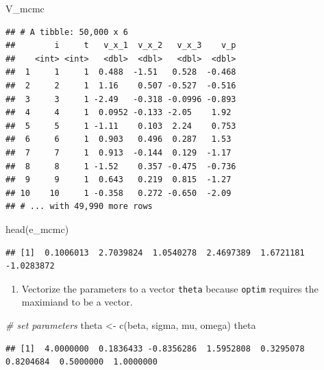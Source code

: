\documentclass[
]{book}
\newenvironment{Shaded}{\begin{snugshade}}{\end{snugshade}}
\newcommand{\CommentTok}[1]{\textcolor[rgb]{0.56,0.35,0.01}{\textit{#1}}}
\newcommand{\FunctionTok}[1]{\textcolor[rgb]{0.00,0.00,0.00}{#1}}
\newcommand{\NormalTok}[1]{#1}
\newcommand{\OtherTok}[1]{\textcolor[rgb]{0.56,0.35,0.01}{#1}}
\providecommand{\tightlist}{%
  \setlength{\itemsep}{0pt}\setlength{\parskip}{0pt}}
\begin{document}
\begin{Shaded}
\begin{Highlighting}[]
\NormalTok{V\_mcmc}
\end{Highlighting}
\end{Shaded}

\begin{verbatim}
## # A tibble: 50,000 x 6
##        i     t   v_x_1  v_x_2   v_x_3    v_p
##    <int> <int>   <dbl>  <dbl>   <dbl>  <dbl>
##  1     1     1  0.488  -1.51   0.528  -0.468
##  2     2     1  1.16    0.507 -0.527  -0.516
##  3     3     1 -2.49   -0.318 -0.0996 -0.893
##  4     4     1  0.0952 -0.133 -2.05    1.92 
##  5     5     1 -1.11    0.103  2.24    0.753
##  6     6     1  0.903   0.496  0.287   1.53 
##  7     7     1  0.913  -0.144  0.129  -1.17 
##  8     8     1 -1.52    0.357 -0.475  -0.736
##  9     9     1  0.643   0.219  0.815  -1.27 
## 10    10     1 -0.358   0.272 -0.650  -2.09 
## # ... with 49,990 more rows
\end{verbatim}

\begin{Shaded}
\begin{Highlighting}[]
\FunctionTok{head}\NormalTok{(e\_mcmc)}
\end{Highlighting}
\end{Shaded}

\begin{verbatim}
## [1]  0.1006013  2.7039824  1.0540278  2.4697389  1.6721181 -1.0283872
\end{verbatim}

\begin{enumerate}
\def\labelenumi{\arabic{enumi}.}
\setcounter{enumi}{1}
\tightlist
\item
  Vectorize the parameters to a vector \texttt{theta} because \texttt{optim} requires the maximiand to be a vector.
\end{enumerate}

\begin{Shaded}
\begin{Highlighting}[]
\CommentTok{\# set parameters}
\NormalTok{theta }\OtherTok{\textless{}{-}} \FunctionTok{c}\NormalTok{(beta, sigma, mu, omega)}
\NormalTok{theta}
\end{Highlighting}
\end{Shaded}

\begin{verbatim}
## [1]  4.0000000  0.1836433 -0.8356286  1.5952808  0.3295078  0.8204684  0.5000000  1.0000000
\end{verbatim}
\end{document}
